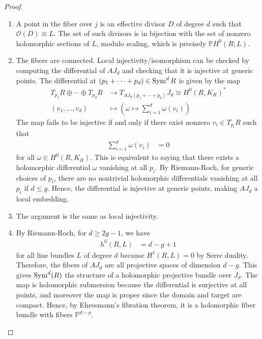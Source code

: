 \documentclass[12pt]{article}
\begin{document}
\begin{proof}
    \leavevmode
\begin{enumerate}
    \item A point in the fiber over $j$ is an effective divisor $D$ of degree $d$
such that $\mathcal{O}(D) \cong L$.
The set of such divisors is in bijection with the set of nonzero holomorphic sections
of $L$, modulo scaling,
which is precisely $\mathbb{P}H^0(R;L)$.
    \item The fibers are connected. Local injectivity/isomorphism can be checked by computing the differential of $AJ_d$ and checking that it is injective at generic points. The differential at $(p_1 + \cdots + p_d) \in \operatorname{Sym}^d R$ is given by the map \begin{align*}
    T_{p_1} R \oplus \cdots \oplus T_{p_d} R & \to T_{AJ_d(p_1 + \cdots + p_d)} J_d \cong H^0(R, K_R)^* \\
    (v_1, \ldots, v_d) & \mapsto \left( \omega \mapsto \sum_{i=1}^d \omega(v_i) \right) 
\end{align*} The map fails to be injective if and only if there exist nonzero $v_i \in T_{p_i} R$ such that \begin{align*}
    \sum_{i=1}^d \omega(v_i) & = 0
\end{align*} for all $\omega \in H^0(R, K_R)$. This is equivalent to saying that there exists a holomorphic differential $\omega$ vanishing at all $p_i$. By Riemann-Roch, for generic choices of $p_i$, there are no nontrivial holomorphic differentials vanishing at all $p_i$ if $d \leq g$. Hence, the differential is injective at generic points, making $AJ_d$ a local embedding.
\item The argument is the same as local injectivity.
\item By Riemann-Roch, for $d \geq 2g - 1$, we have \begin{align*}
    h^0(R, L) & = d - g + 1
\end{align*} for all line bundles $L$ of degree $d$ because $H^1(R, L) = 0$ by Serre duality. Therefore, the fibers of $AJ_d$ are all projective spaces of dimension $d - g$. This gives $\operatorname{Sym}^d(R)$ the structure of a holomorphic projective bundle over $J_d$. The map is holomorphic submersion because the differential is surjective at all points, and moreover the map is proper since the domain and target are compact. Hence, by Ehresmann's fibration theorem, it is a holomorphic fiber bundle with fibers $\mathbb{P}^{d-g}$.
\qedhere
\end{enumerate}
\end{proof}
\end{document}
